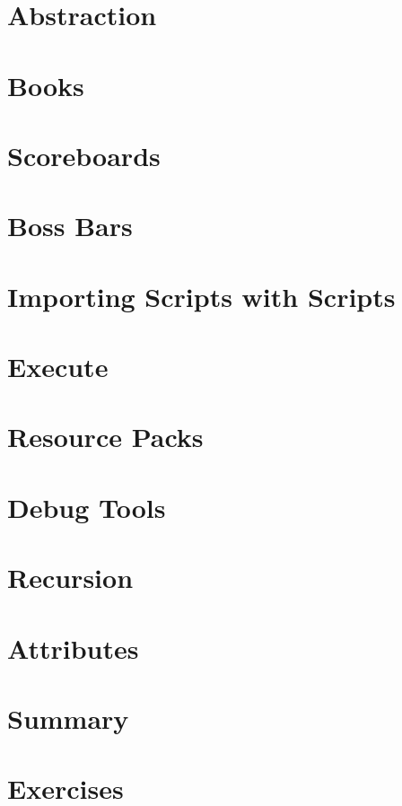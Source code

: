 \documentclass[oneside]{book}
\begin{document}
\section{Abstraction}
\blindtext

\section{Books}
\blindtext

\section{Scoreboards}
\blindtext

\section{Boss Bars}
\blindtext

\section{Importing Scripts with Scripts}
\blindtext

\section{Execute}
\blindtext

\section{Resource Packs}
\blindtext

\section{Debug Tools}
\blindtext

\section{Recursion}
\blindtext

\section{Attributes}
\blindtext

\section{Summary}
\blindtext

\section{Exercises}
\blindtext
\end{document}
